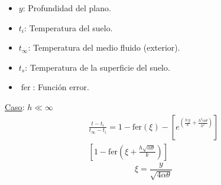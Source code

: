 \documentclass[letter,oneside,10pt]{article}
\DeclareMathOperator{\fer}{fer}
\begin{document}
\begin{multicols}{3}
\begin{itemize}
    \item $y$: Profundidad del plano.
    \item $t_i$: Temperatura del suelo.
    \item $t_\infty$: Temperatura del medio fluido (exterior).
    \item $t_s$: Temperatura de la superficie del suelo.
    \item $\fer$: Función error.
\end{itemize}
\scriptsize
\underline{Caso}: $h\ll\infty$
\vspace{-0.3cm}
\begin{equation*}
    \begin{split}
        \frac{t-t_i}{t_\infty-t_i} = 
        1 -
        \text{fer}(\xi) -
        \left[
            e^{\left(
                \frac{h\,y}{k}+\frac{h^2\alpha\theta}{k^2}
            \right)}
        \right]\\
        \left[
            1 - \text{fer}\left(
                \xi + \frac{h\sqrt{\alpha\theta}}{k}
            \right)
        \right]
    \end{split}
\end{equation*}
\vspace{-0.3cm}
\begin{equation*}
    \xi = \frac{y}{\sqrt{4\alpha\theta}}
\end{equation*}

\vspace{-0.5cm}

\end{multicols}
\end{document}
